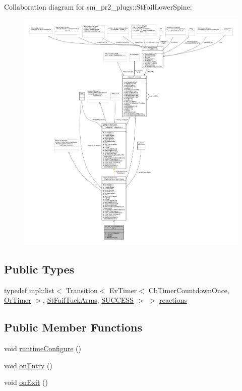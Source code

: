 Collaboration diagram for sm\+\_\+pr2\+\_\+plugs\+:\+:St\+Fail\+Lower\+Spine\+:
\nopagebreak
\begin{figure}[H]
\begin{center}
\leavevmode
\includegraphics[width=350pt]{structsm__pr2__plugs_1_1StFailLowerSpine__coll__graph}
\end{center}
\end{figure}
\subsection*{Public Types}
\begin{DoxyCompactItemize}
\item 
typedef mpl\+::list$<$ Transition$<$ Ev\+Timer$<$ Cb\+Timer\+Countdown\+Once, \hyperlink{classsm__pr2__plugs_1_1OrTimer}{Or\+Timer} $>$, \hyperlink{structsm__pr2__plugs_1_1StFailTuckArms}{St\+Fail\+Tuck\+Arms}, \hyperlink{classSUCCESS}{S\+U\+C\+C\+E\+SS} $>$ $>$ \hyperlink{structsm__pr2__plugs_1_1StFailLowerSpine_a84201506710211472a927aaaf1fbffd4}{reactions}
\end{DoxyCompactItemize}
\subsection*{Public Member Functions}
\begin{DoxyCompactItemize}
\item 
void \hyperlink{structsm__pr2__plugs_1_1StFailLowerSpine_af368b88521b53cb5b46dc68a2dffa036}{runtime\+Configure} ()
\item 
void \hyperlink{structsm__pr2__plugs_1_1StFailLowerSpine_a46609d10b4a893168fcfd05e71289b9a}{on\+Entry} ()
\item 
void \hyperlink{structsm__pr2__plugs_1_1StFailLowerSpine_a237799c548ee0129fd423e3e973eb605}{on\+Exit} ()
\end{DoxyCompactItemize}

